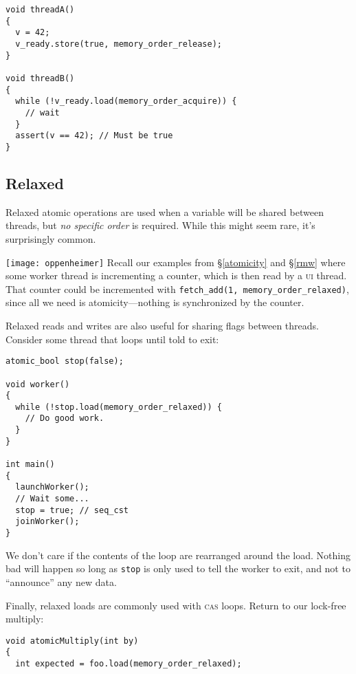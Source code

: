 \documentclass[fontsize=\bodyfontsize, numbers=endperiod]{scrartcl}
\newcommand{\codesize}{\fontsize{\bodyfontsize}{\bodybaselineskip}}
\newcommand{\secref}[1]{\hyperref[#1]{\textsc{\S}\ref*{#1}}}
\newenvironment{colfigure}
  {\par\vspace{1\baselineskip minus 0.5\baselineskip}\noindent\minipage{\linewidth}}
  {\endminipage\vspace{1\baselineskip minus 0.7\baselineskip}}
\begin{document}
\begin{multicols}{2}
\begin{colfigure}
\begin{verbatim}
void threadA()
{
  v = 42;
  v_ready.store(true, memory_order_release);
}

void threadB()
{
  while (!v_ready.load(memory_order_acquire)) {
    // wait
  }
  assert(v == 42); // Must be true
}
\end{verbatim}
\end{colfigure}

\subsection{Relaxed}

Relaxed atomic operations are used when a variable will be shared between threads,
but \emph{no specific order} is required.
While this might seem rare, it's surprisingly common.
\begin{colfigure}
\centering
\texttt{[image: oppenheimer]}
\label{oppenheimer}
\end{colfigure}
Recall our examples from \secref{atomicity} and \secref{rmw} where some worker
thread is incrementing a counter, which is then read by a \textsc{ui} thread.
That counter could be incremented with
\texttt{fetch\_add(1, memory\_order\_relaxed)},
since all we need is atomicity---nothing is synchronized by the counter.

Relaxed reads and writes are also useful for sharing flags between threads.
Consider some thread that loops until told to exit:
\begin{colfigure}
\begin{verbatim}
atomic_bool stop(false);

void worker()
{
  while (!stop.load(memory_order_relaxed)) {
    // Do good work.
  }
}

int main()
{
  launchWorker();
  // Wait some...
  stop = true; // seq_cst
  joinWorker();
}
\end{verbatim}
\end{colfigure}
We don't care if the contents of the loop are rearranged around the load.
Nothing bad will happen so long as \texttt{stop} is only used to tell the
worker to exit, and not to ``announce'' any new data.

Finally, relaxed loads are commonly used with \textsc{cas} loops.
Return to our lock-free multiply:
\begin{colfigure}
\begin{verbatim}
void atomicMultiply(int by)
{
  int expected = foo.load(memory_order_relaxed);


\end{verbatim}
\end{colfigure}
\end{multicols}
\end{document}
